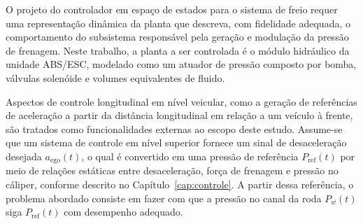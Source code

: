 


O projeto do controlador em espaço de estados para o sistema de freio requer uma representação dinâmica da planta que descreva, com fidelidade adequada, o comportamento do subsistema responsável pela geração e modulação da pressão de frenagem. Neste trabalho, a planta a ser controlada é o módulo hidráulico da unidade ABS/ESC, modelado como um atuador de pressão composto por bomba, válvulas solenóide e volumes equivalentes de fluido.

Aspectos de controle longitudinal em nível veicular, como a geração de referências de aceleração a partir da distância longitudinal em relação a um veículo à frente, são tratados como funcionalidades externas ao escopo deste estudo. Assume-se que um sistema de controle em nível superior fornece um sinal de desaceleração desejada $a_{\mathrm{ego}}(t)$, o qual é convertido em uma pressão de referência $P_{\mathrm{ref}}(t)$ por meio de relações estáticas entre desaceleração, força de frenagem e pressão no cáliper, conforme descrito no Capítulo~\ref{cap:controle}. A partir dessa referência, o problema abordado consiste em fazer com que a pressão no canal da roda $P_w(t)$ siga $P_{\mathrm{ref}}(t)$ com desempenho adequado.

